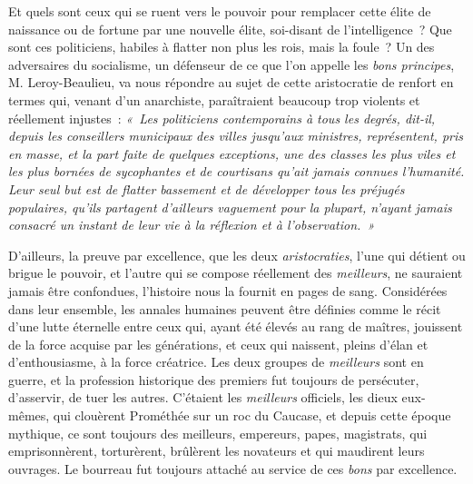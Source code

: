 \documentclass[french,twoside]{book} %
\begin{document}
Et quels sont ceux qui se ruent vers le pouvoir pour remplacer cette élite de naissance ou de fortune par une nouvelle élite, soi-disant de l’intelligence ? Que sont ces politiciens, habiles à flatter non plus les rois, mais la foule ? Un des adversaires du socialisme, un défenseur de ce que l’on appelle les \emph{bons principes}, M. Leroy-Beaulieu, va nous répondre au sujet de cette aristocratie de  renfort en termes qui, venant d’un anarchiste, paraîtraient beaucoup trop violents et réellement injustes : \emph{« Les politiciens contemporains à tous les degrés, dit-il, depuis les conseillers municipaux des villes jusqu’aux ministres, représentent, pris en masse, et la part faite de quelques exceptions, une des classes les plus viles et les plus bornées de sycophantes et de courtisans qu’ait jamais connues l’humanité. Leur seul but est de flatter bassement et de développer tous les préjugés populaires, qu’ils partagent d’ailleurs vaguement pour la plupart, n’ayant jamais consacré un instant de leur vie à la réflexion et à l’observation. »}\par
D’ailleurs, la preuve par excellence, que les deux \emph{aristocraties}, l’une qui  détient ou brigue le pouvoir, et l’autre qui se compose réellement des \emph{meilleurs}, ne sauraient jamais être confondues, l’histoire nous la fournit en pages de sang. Considérées dans leur ensemble, les annales humaines peuvent être définies comme le récit d’une lutte éternelle entre ceux qui, ayant été élevés au rang de maîtres, jouissent de la force acquise par les générations, et ceux qui naissent, pleins d’élan et d’enthousiasme, à la force créatrice. Les deux groupes de \emph{meilleurs} sont en guerre, et la profession historique des premiers fut toujours de persécuter, d’asservir, de tuer les autres. C’étaient les \emph{meilleurs} officiels, les dieux eux-mêmes, qui clouèrent Prométhée sur un roc du Caucase, et depuis cette époque mythique,  ce sont toujours des meilleurs, empereurs, papes, magistrats, qui emprisonnèrent, torturèrent, brûlèrent les novateurs et qui maudirent leurs ouvrages. Le bourreau fut toujours attaché au service de ces \emph{bons} par excellence.\par
\end{document}
